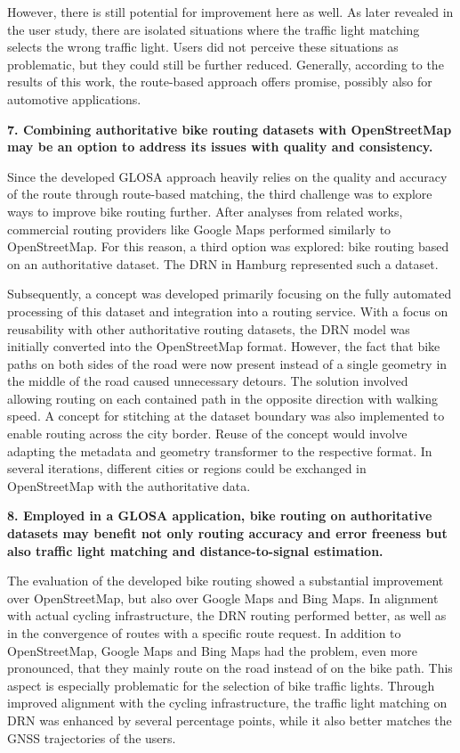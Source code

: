 However, there is still potential for improvement here as well. As later revealed in the user study, there are isolated situations where the traffic light matching selects the wrong traffic light. Users did not perceive these situations as problematic, but they could still be further reduced. Generally, according to the results of this work, the route-based approach offers promise, possibly also for automotive applications.

\textbf{\color{cidarkblue}7. Combining authoritative bike routing datasets with OpenStreetMap may be an option to address its issues with quality and consistency.}

Since the developed GLOSA approach heavily relies on the quality and accuracy of the route through route-based matching, the third challenge was to explore ways to improve bike routing further. After analyses from related works, commercial routing providers like Google Maps performed similarly to OpenStreetMap. For this reason, a third option was explored: bike routing based on an authoritative dataset. The DRN in Hamburg represented such a dataset. 

Subsequently, a concept was developed primarily focusing on the fully automated processing of this dataset and integration into a routing service. With a focus on reusability with other authoritative routing datasets, the DRN model was initially converted into the OpenStreetMap format. However, the fact that bike paths on both sides of the road were now present instead of a single geometry in the middle of the road caused unnecessary detours. The solution involved allowing routing on each contained path in the opposite direction with walking speed. A concept for stitching at the dataset boundary was also implemented to enable routing across the city border. Reuse of the concept would involve adapting the metadata and geometry transformer to the respective format. In several iterations, different cities or regions could be exchanged in OpenStreetMap with the authoritative data.

\textbf{\color{cidarkblue}8. Employed in a GLOSA application, bike routing on authoritative datasets may benefit not only routing accuracy and error freeness but also traffic light matching and distance-to-signal estimation.} 

The evaluation of the developed bike routing showed a substantial improvement over OpenStreetMap, but also over Google Maps and Bing Maps. In alignment with actual cycling infrastructure, the DRN routing performed better, as well as in the convergence of routes with a specific route request. In addition to OpenStreetMap, Google Maps and Bing Maps had the problem, even more pronounced, that they mainly route on the road instead of on the bike path. This aspect is especially problematic for the selection of bike traffic lights. Through improved alignment with the cycling infrastructure, the traffic light matching on DRN was enhanced by several percentage points, while it also better matches the GNSS trajectories of the users. 

